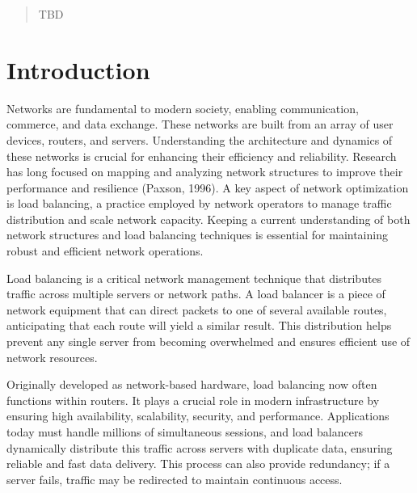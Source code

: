\documentclass[12pt]{cwru_thesis}
\begin{document}
\printnomenclature

\begin{abstract}
  TBD
\end{abstract}

\mainmatter

\setcounter{secnumdepth}{2}

\chapter{Introduction} 
\label{chap:intro}

Networks are fundamental to modern society, enabling communication, commerce, and data exchange. These networks are built from an array of user devices, routers, and servers. Understanding the architecture and dynamics of these networks is crucial for enhancing their efficiency and reliability. Research has long focused on mapping and analyzing network structures to improve their performance and resilience (Paxson, 1996). A key aspect of network optimization is load balancing, a practice employed by network operators to manage traffic distribution and scale network capacity. Keeping a current understanding of both network structures and load balancing techniques is essential for maintaining robust and efficient network operations.

Load balancing is a critical network management technique that distributes traffic across multiple servers or network paths. A load balancer is a piece of network equipment that can direct packets to one of several available routes, anticipating that each route will yield a similar result. This distribution helps prevent any single server from becoming overwhelmed and ensures efficient use of network resources.

Originally developed as network-based hardware, load balancing now often functions within routers. It plays a crucial role in modern infrastructure by ensuring high availability, scalability, security, and performance. Applications today must handle millions of simultaneous sessions, and load balancers dynamically distribute this traffic across servers with duplicate data, ensuring reliable and fast data delivery. This process can also provide redundancy; if a server fails, traffic may be redirected to maintain continuous access.
\end{document}
